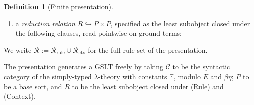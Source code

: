 \documentclass[11pt]{article}
\theoremstyle{plain}
\theoremstyle{definition}
\newtheorem{definition}[theorem]{Definition}
\theoremstyle{remark}
\newcommand{\rew}{\leadsto}
\begin{document}
\begin{definition}[Finite presentation]
\begin{enumerate}[leftmargin=*]
        We display rules in the standard tree form, writing repeated
        metavariable tokens for the same input. A repeated occurrence
        of a metavariable $\omega : A$ on the LHS denotes composition
        with the diagonal $\Delta_{A} : A \to A \times A$ (or, more
        generally, an iterated $\Delta$ for several occurrences); the
        LHS as a whole is the categorically linear morphism that, after
        $\Delta$-expansion, uses each metavariable input once. This
        unifies the two traditions of ``linearity'':
        \emph{categorical linearity} (the LHS is a well-formed morphism
        in the syntactic category, with $\Delta$ available because of
        finite products) is always assumed, and \emph{syntactic
        linearity} (no metavariable token repeats) is the special case
        of categorical linearity in which no $\Delta$-composition
        occurs;
  \item a \emph{reduction relation} $R \hookrightarrow P \times P$,
        specified as the least subobject closed under the following
        clauses, read pointwise on ground terms:
\end{enumerate}
We write
$\mathcal{R} := \mathcal{R}_{\mathrm{rule}} \cup \mathcal{R}_{\mathrm{ctx}}$
for the full rule set of the presentation.
\end{definition}

The presentation generates a GSLT freely by taking $\mathcal{C}$ to be the
syntactic category of the simply-typed $\lambda$-theory with constants
$\mathbb{F}$, modulo $E$ and $\beta\eta$; $P$ to be a base sort, and $R$ to
be the least subobject closed under (Rule) and (Context).
\end{document}
